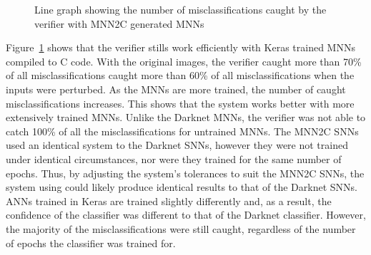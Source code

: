 \begin{figure}[H]
	\centering
	\scalebox{0.9}{}
	\caption{Line graph showing the number of misclassifications caught by the verifier with \ac{MNN2C} generated \acp{MNN} \label{fig:sign-graphboth-mnn2c}}
\end{figure}

Figure~\ref{fig:sign-graphboth-mnn2c} shows that the verifier stills work efficiently with Keras trained \acp{MNN} compiled to C code.
With the original images, the verifier caught more than 70\% of all misclassifications caught more than 60\% of all misclassifications when the inputs were perturbed.
As the \acp{MNN} are more trained, the number of caught misclassifications increases.
This shows that the system works better with more extensively trained \acp{MNN}.
Unlike the Darknet \acp{MNN}, the verifier was not able to catch 100\% of all the misclassifications for untrained \acp{MNN}.
The \ac{MNN2C} \acp{SNN} used an identical system to the Darknet \acp{SNN}, however they were not trained under identical circumstances, nor were they trained for the same number of epochs.
Thus, by adjusting the system's tolerances to suit the \ac{MNN2C} \acp{SNN}, the system using could likely produce identical results to that of the Darknet \acp{SNN}.
\acp{ANN} trained in Keras are trained slightly differently and, as a result, the confidence of the classifier was different to that of the Darknet classifier.
However, the majority of the misclassifications were still caught, regardless of the number of epochs the classifier was trained for.





















